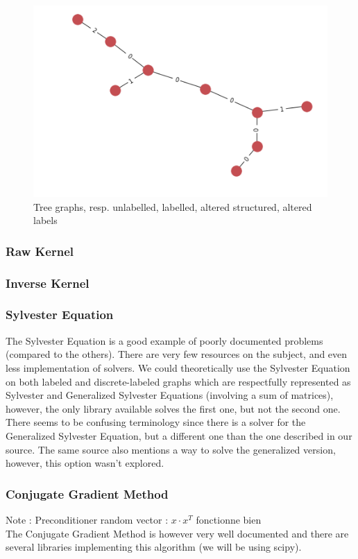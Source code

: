 \documentclass{article}
\theoremstyle{definition}
\begin{document}
\begin{figure}[!htb]
\begin{multicols}{4}
		\includegraphics[width=\linewidth]{data/generated-graphs/tree_altered_labels.png}\par
	\end{multicols}
	\caption{Tree graphs, resp. unlabelled, labelled, altered structured, altered labels}
\end{figure}
\subsubsection{Raw Kernel}
\subsubsection{Inverse Kernel}
\subsubsection{Sylvester Equation}
The Sylvester Equation is a good example of poorly documented problems (compared to the others). There are very few resources on the subject, and even less implementation of solvers. We could theoretically use the Sylvester Equation on both labeled and discrete-labeled graphs which are respectfully represented as Sylvester and Generalized Sylvester Equations (involving a sum of matrices), however, the only library available solves the first one, but not the second one. There seems to be confusing terminology since there is a solver for the Generalized Sylvester Equation, but a different one than the one described in our source\cite{vishwanathan_graph_2010}. The same source also mentions a way to solve the generalized version\cite{lathauwer2004}, however, this option wasn't explored.  
\subsubsection{Conjugate Gradient Method}
Note : Preconditioner random vector : $x \cdot x^{T}$ fonctionne bien\\
The Conjugate Gradient Method is however very well documented\cite{nesterov_lectures_2018} and there are several libraries implementing this algorithm (we will be using scipy).
\end{document}
